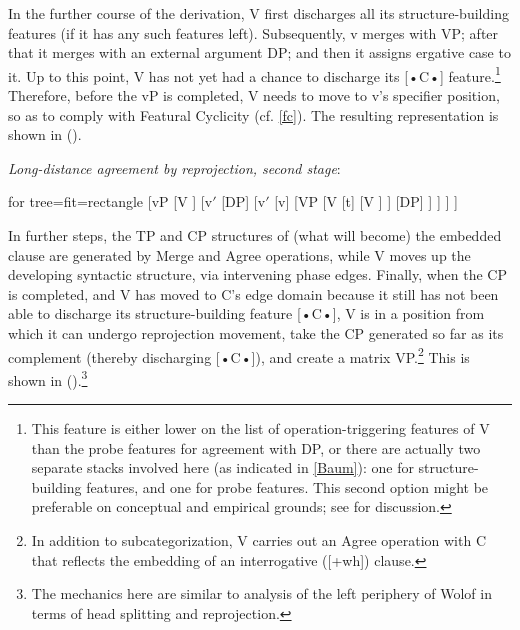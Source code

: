 \documentclass[output=paper
,modfonts
,nonflat]{langsci/langscibook}
\begin{document}
	In the further course of the derivation, V first discharges all its
	structure-building features (if it has any such features
	left). Subsequently, v merges with VP; after that it merges 
	with an external argument DP; and then it assigns ergative case to it. Up to this point, V has not yet had a chance to discharge its [•C•] feature.\footnote{This
		feature is either lower on the list of operation-triggering
		features of V than the probe features for agreement with
		DP, or there are actually two separate stacks involved here
		(as indicated in \ref{Baum}):
		one for structure-building features, and one for probe
		features. This second option might be preferable on conceptual and empirical
		grounds; see \cite{Mueller:04:arg,Mueller:09:eao} for discussion.}
	Therefore, before
	the vP is completed, V needs to move to v's specifier position, so
	as to comply with Featural Cyclicity (cf. \ref{fc}). The resulting
	representation is shown in (\Next).
	
		\begin{exe}
			\ex	\label{ex:mueller:33} \textit{Long-distance agreement by reprojection, second stage}:\\\label{Baum2}
				\begin{forest} 	for tree={fit=rectangle}
					[vP
					[V ]
					[v$'$
					[DP]
					[v$'$
					[v] 
					[VP
					[V
					[t]
					[V  ] ]
					[DP]
					] ] ] ]	
			\end{forest}
		\end{exe}
\noindent In further steps, the TP and CP structures of (what will become) the
	embedded clause are generated by Merge and Agree operations, while V moves up
	the developing syntactic structure, via intervening phase
	edges. Finally, when the CP is completed, and V has moved to C's
	edge domain because it still has not been able to discharge its
	structure-building feature [•C•], V is in a position from which it
	can undergo reprojection movement, take the CP generated so far as
	its complement (thereby discharging [•C•]), and create a matrix
	VP.\footnote{In addition to subcategorization, V carries out an
		Agree operation with C that reflects the embedding of an
		interrogative ([+wh]) clause.} This is
	shown in (\Next).\footnote{The mechanics here are similar to 
		 analysis of the left periphery of Wolof
		in terms of head splitting and reprojection.}\largerpage[-3]   
\end{document}
